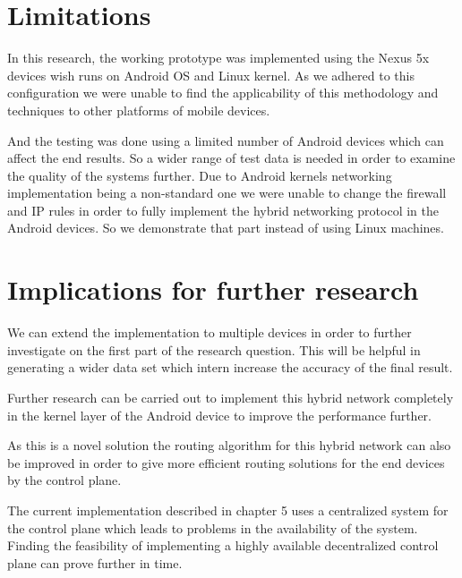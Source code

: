 \section{Limitations}

In this research, the working prototype was implemented using the Nexus 5x devices wish runs on Android OS and Linux kernel. As we adhered to this configuration we were unable to find the applicability of this methodology and techniques to other platforms of mobile devices.

And the testing was done using a limited number of Android devices which can affect the end results. So a wider range of test data is needed in order to examine the quality of the systems further. 
Due to Android kernels networking implementation being a non-standard one we were unable to change the firewall and IP rules in order to fully implement the hybrid networking protocol in the Android devices. So we demonstrate that part instead of using  Linux machines.




\vspace{0.7cm}

\section{Implications for further research}

We can extend the implementation to multiple devices in order to further investigate on the first part of the research question. This will be helpful in generating a wider data set which intern increase the accuracy of the final result.

Further research can be carried out to implement this hybrid network completely in the kernel layer of the Android device to improve the performance further. 

As this is a novel solution the routing algorithm for this hybrid network can also be improved in order to give more efficient routing solutions for the end devices by the control plane. 

The current implementation described in chapter 5 uses a centralized system for the control plane which leads to problems in the availability of the system. Finding the feasibility of implementing a highly available decentralized control plane can prove further in time. 
